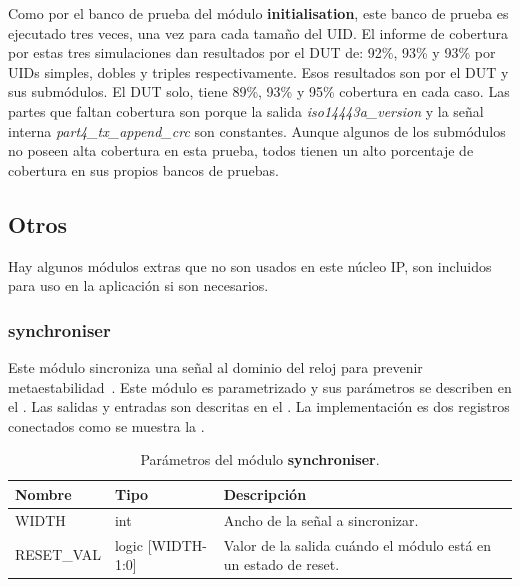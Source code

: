 \documentclass[a4paper, twoside, 11pt]{report}
\begin{document}
Como por el banco de prueba del módulo \textbf{initialisation}, este banco de prueba es ejecutado tres veces, una vez para cada tamaño del UID. El informe de cobertura por estas tres simulaciones dan resultados por el DUT de: 92\%, 93\% y 93\% por UIDs simples, dobles y triples respectivamente. Esos resultados son por el DUT y sus submódulos. El DUT solo, tiene 89\%, 93\% y 95\% cobertura en cada caso. Las partes que faltan cobertura son porque la salida \textit{iso14443a\_version} y la señal interna \textit{part4\_tx\_append\_crc} son constantes. Aunque algunos de los submódulos no poseen alta cobertura en esta prueba, todos tienen un alto porcentaje de cobertura en sus propios bancos de pruebas.

\FloatBarrier
\subsection{Otros}

Hay algunos módulos extras que no son usados en este núcleo IP, son incluidos para uso en la aplicación si son necesarios.

\FloatBarrier
\subsubsection{synchroniser}

Este módulo sincroniza una señal al dominio del reloj para prevenir metaestabilidad~\cite{synch_arb_in_digital_systems}. Este módulo es parametrizado y sus parámetros se describen en el . Las salidas y entradas son descritas en el . La implementación es dos registros conectados como se muestra la .

\begin{table}[htb]
  \centering
  \tablezebra
  \begin{tabulary}{\linewidth}{l|l|L}
    \textbf{Nombre}&\textbf{Tipo}&\textbf{Descripción} \\
    \hline
    WIDTH&int&Ancho de la señal a sincronizar. \\
    RESET\_VAL&logic [WIDTH-1:0]&Valor de la salida cuándo el módulo está en un estado de reset. \\
  \end{tabulary}
  \caption{Parámetros del módulo \textbf{synchroniser}.}
  \label{tab:params_synchroniser}
\end{table}
\end{document}
